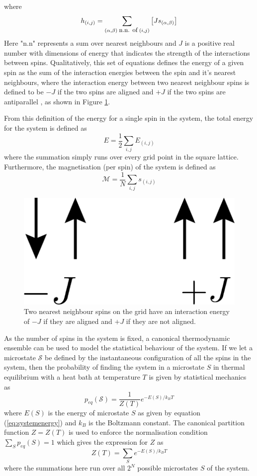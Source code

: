 \documentclass[11pt]{iopart}
\begin{document}
where
\begin{equation}
h_{(i, j)} = \sum_{(\alpha, \beta) \; \textrm{\small{n.n. of}} \; (i, j)} \left[ J  s_{(\alpha, \beta)} \right]
\end{equation}
Here "n.n" represents a sum over nearest neighbours and $J$ is a positive real number with dimensions of energy that indicates the strength of the interactions between spins. Qualitatively, this set of equations defines the energy of a given spin as the sum of the interaction energies between the spin and it's nearest neighbours, where the interaction energy between two nearest neighbour spins is defined to be $-J$ if the two spins are aligned and $+J$ if the two spins are antiparallel \cite{handout}, as shown in Figure \ref{fig:spinalignment}.

From this definition of the energy for a single spin in the system, the total energy for the system is defined as
\begin{equation}
\label{eq:systemenergy}
E = \frac{1}{2} \sum_{i, j} E_{(i, j)}
\end{equation}
where the summation simply runs over every grid point in the square lattice.
Furthermore, the magnetisation (per spin) of the system is defined as
\begin{equation}
\mathcal{M} = \frac{1}{N} \sum_{i, j} s_{(i, j)}
\end{equation}

\begin{figure}[t]
  \centering
  \includegraphics[width=0.13\linewidth]{images/spins/4x/spins@4x.png}
  \caption{Two nearest neighbour spins on the grid have an interaction energy of $-J$ if they are aligned and $+J$ if they are not aligned.}
  \label{fig:spinalignment}
\end{figure}

As the number of spins in the system is fixed, a canonical thermodynamic ensemble can be used to model the statistical behaviour of the system. If we let a microstate $\mathcal{S}$ be defined by the instantaneous configuration of all the spins in the system, then the probability of finding the system in a microstate $S$ in thermal equilibrium with a heat bath at temperature $T$ is given by statistical mechanics as \cite{statmech} \cite{handout}
\begin{equation}
\label{eq:probabilitydist}
p_{eq}(\mathcal{S}) = \frac{1}{Z(T)} e^{-E(S)/k_B T}
\end{equation}
where $E(S)$ is the energy of microstate $S$ as given by equation (\ref{eq:systemenergy}) and $k_B$ is the Boltzmann constant. The canonical partition function $Z = Z(T)$ is used to enforce the normalisation condition $\sum_S{p_{eq}(S)} = 1$ which gives the expression for $Z$ as
\begin{equation}
Z(T) = \sum_{S} e^{-E(S)/k_B T}
\end{equation}
where the summations here run over all $2^N$ possible microstates $S$ of the system.
\end{document}
